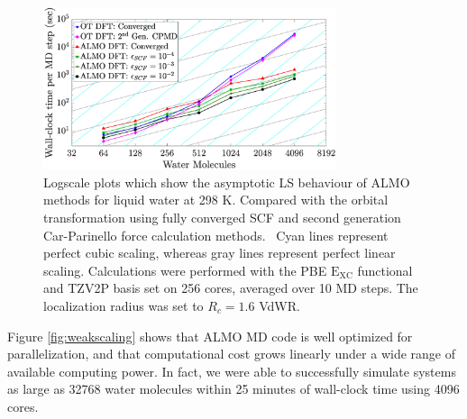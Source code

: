 \documentclass[aps,prl,reprint,amsmath,amssymb]{revtex4-1}
\begin{document}
\begin{figure}
\includegraphics[trim={2.5cm 0.5cm 3.4cm 0.1cm},clip,width=8.6cm]{strongscaling_log.eps}
\caption{\label{fig:strongscaling_log} Logscale plots which show the asymptotic LS behaviour of ALMO methods for liquid water at 298 K.
Compared with the orbital transformation using fully converged SCF and second generation Car-Parinello force calculation methods.~\cite{a:ot,a:ot2,a:2ndcpmd}
Cyan lines represent perfect cubic scaling, whereas gray lines represent perfect linear scaling. 
Calculations were performed with the PBE $\mathrm{E_{XC}}$ functional and TZV2P basis set on 256 cores, averaged over 10 MD steps. 
The localization radius was set to $R_{c} = 1.6$ VdWR.}
\end{figure}

Figure \ref{fig:weakscaling} shows that ALMO MD code is well optimized for parallelization, and that computational cost grows linearly under a wide range of available computing power. 
In fact, we were able to successfully simulate systems as large as 32768 water molecules within 25 minutes of wall-clock time using 4096 cores.

\end{document}

